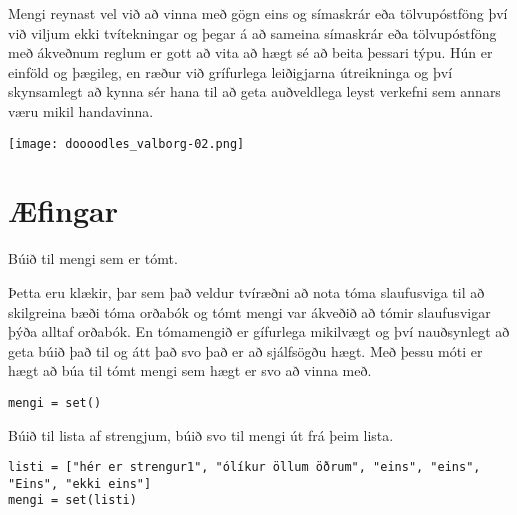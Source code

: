 Mengi reynast vel við að vinna með gögn eins og símaskrár eða tölvupóstföng því við viljum ekki tvítekningar og þegar á að sameina símaskrár eða tölvupóstföng með ákveðnum reglum er gott að vita að hægt sé að beita þessari týpu.
Hún er einföld og þægileg, en ræður við grífurlega leiðigjarna útreikninga og því skynsamlegt að kynna sér hana til að geta auðveldlega leyst verkefni sem annars væru mikil handavinna.

	\begin{center}
		\texttt{[image: doooodles\_valborg-02.png]}
	\end{center}

\newpage
\section{Æfingar}
\begin{exercise}\label{set1}
Búið til mengi sem er tómt.
\end{exercise}
\begin{Answer}[ref={set1}]
Þetta eru klækir, þar sem það veldur tvíræðni að nota tóma slaufusviga til að skilgreina bæði tóma orðabók og tómt mengi var ákveðið að tómir slaufusvigar þýða alltaf orðabók.
En tómamengið er gífurlega mikilvægt og því nauðsynlegt að geta búið það til og átt það svo það er að sjálfsögðu hægt.
Með þessu móti er hægt að búa til tómt mengi sem hægt er svo að vinna með.
	\begin{lstlisting}
mengi = set()
	\end{lstlisting}
\end{Answer}


\begin{exercise}\label{set2}
Búið til lista af strengjum, búið svo til mengi út frá þeim lista.
\end{exercise}
\begin{Answer}[ref={set2}]
	
	\begin{lstlisting}
listi = ["hér er strengur1", "ólíkur öllum öðrum", "eins", "eins", "Eins", "ekki eins"]
mengi = set(listi)\end{lstlisting}
\end{Answer}



